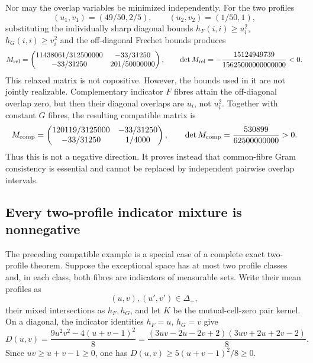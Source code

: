 \documentclass[11pt]{article}
\begin{document}
Nor may the overlap variables be minimized independently.  For the two
profiles
\[
 (u_1,v_1)=(49/50,2/5),\qquad (u_2,v_2)=(1/50,1),
\]
substituting the individually sharp diagonal bounds
$h_F(i,i)\geq u_i^2$, $h_G(i,i)\geq v_i^2$ and the off-diagonal Frechet
bounds produces
\[
 M_{\rm rel}=
 \begin{pmatrix}
 11438061/312500000&-33/31250\\
 -33/31250&201/50000000
 \end{pmatrix},
 \qquad
 \det M_{\rm rel}=-\frac{15124949739}{15625000000000000}<0.
\]
This relaxed matrix is not copositive.  However, the bounds used in it are
not jointly realizable.  Complementary indicator $F$ fibres attain the
off-diagonal overlap zero, but then their diagonal overlaps are $u_i$, not
$u_i^2$.  Together with constant $G$ fibres, the resulting compatible
matrix is
\[
 M_{\rm comp}=
 \begin{pmatrix}
 120119/3125000&-33/31250\\
 -33/31250&1/4000
 \end{pmatrix},
 \qquad
 \det M_{\rm comp}=\frac{530899}{62500000000}>0.
\]
Thus this is not a negative direction.  It proves instead that common-fibre
Gram consistency is essential and cannot be replaced by independent
pairwise overlap intervals.

\subsection{Every two-profile indicator mixture is nonnegative}

The preceding compatible example is a special case of a complete exact
two-profile theorem.  Suppose the exceptional space has at most two profile
classes and, in each class, both fibres are indicators of measurable sets.
Write their mean profiles as
\[
 (u,v),(u',v')\in\Delta_+,
\]
their mixed intersections as $h_F,h_G$, and let $K$ be the mutual-cell-zero
pair kernel.  On a diagonal, the indicator identities
$h_F=u$, $h_G=v$ give
\begin{equation}
 D(u,v)=
 \frac{9u^2v^2-4(u+v-1)^2}{8}
 =\frac{(3uv-2u-2v+2)(3uv+2u+2v-2)}8.
 \label{eq:indicator-diagonal}
\end{equation}
Since $uv\geq u+v-1\geq0$, one has
$D(u,v)\geq5(u+v-1)^2/8\geq0$.
\end{document}
